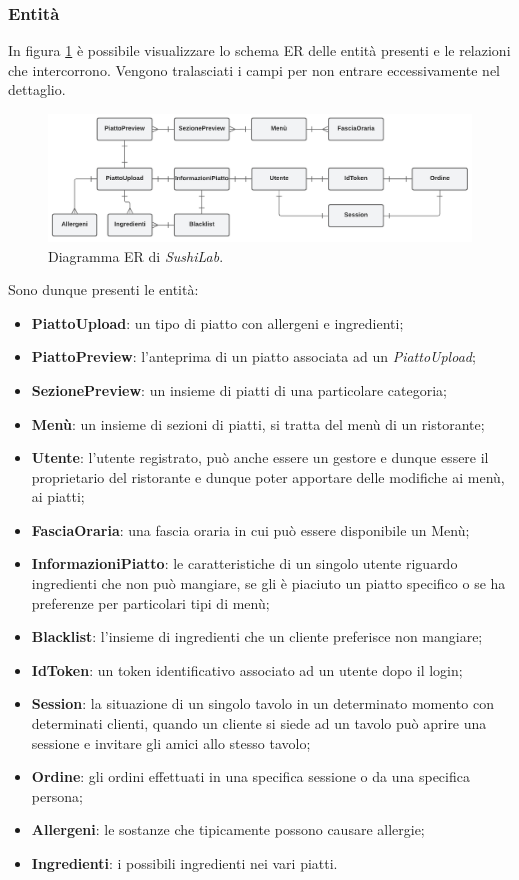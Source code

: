\subsubsection{Entità}
In figura \ref{ER-sushilab} è possibile visualizzare lo schema ER delle entità presenti e le relazioni che intercorrono. Vengono tralasciati i campi per non entrare eccessivamente nel dettaglio.
\FloatBarrier
\begin{figure}[!ht]
\centering
\includegraphics[width=1\linewidth]{immagini/ER_sushilab.pdf}
\caption{Diagramma ER di \textit{SushiLab}.}
\label{ER-sushilab}
\end{figure}
\FloatBarrier
Sono dunque presenti le entità:
\begin{itemize}
  \item \textbf{PiattoUpload}: un tipo di piatto con allergeni e ingredienti;
  \item \textbf{PiattoPreview}: l'anteprima di un piatto associata ad un \textit{PiattoUpload};
  \item \textbf{SezionePreview}: un insieme di piatti di una particolare categoria;
  \item \textbf{Menù}: un insieme di sezioni di piatti, si tratta del menù di un ristorante;
  \item \textbf{Utente}: l'utente registrato, può anche essere un gestore e dunque essere il proprietario del ristorante e dunque poter apportare delle modifiche ai menù, ai piatti;
  \item \textbf{FasciaOraria}: una fascia oraria in cui può essere disponibile un Menù;
  \item \textbf{InformazioniPiatto}: le caratteristiche di un singolo utente riguardo ingredienti che non può mangiare, se gli è piaciuto un piatto specifico o se ha preferenze per particolari tipi di menù;
  \item \textbf{Blacklist}: l'insieme di ingredienti che un cliente preferisce non mangiare;
  \item \textbf{IdToken}: un token identificativo associato ad un utente dopo il login;
  \item \textbf{Session}: la situazione di un singolo tavolo in un determinato momento con determinati clienti, quando un cliente si siede ad un tavolo può aprire una sessione e invitare gli amici allo stesso tavolo;
  \item \textbf{Ordine}: gli ordini effettuati in una specifica sessione o da una specifica persona;
  \item \textbf{Allergeni}: le sostanze che tipicamente possono causare allergie;
  \item \textbf{Ingredienti}: i possibili ingredienti nei vari piatti.
\end{itemize}
